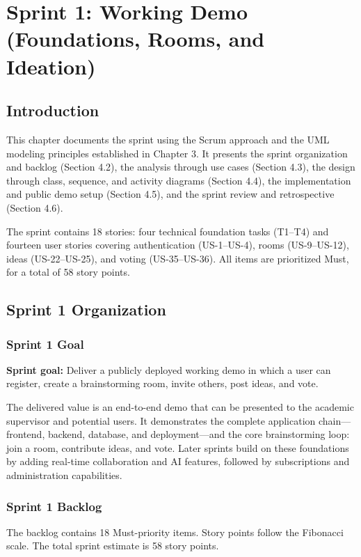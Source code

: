 \documentclass[12pt,a4paper]{report}
\begin{document}
\setcounter{chapter}{3}
\chapter{Sprint 1: Working Demo (Foundations, Rooms, and Ideation)}

\section{Introduction}


This chapter documents the sprint using the Scrum approach and the UML modeling principles established in Chapter 3. It presents the sprint organization and backlog (Section 4.2), the analysis through use cases (Section 4.3), the design through class, sequence, and activity diagrams (Section 4.4), the implementation and public demo setup (Section 4.5), and the sprint review and retrospective (Section 4.6).

The sprint contains 18 stories: four technical foundation tasks (T1--T4) and fourteen user stories covering authentication (US-1--US-4), rooms (US-9--US-12), ideas (US-22--US-25), and voting (US-35--US-36). All items are prioritized Must, for a total of 58 story points.

\section{Sprint 1 Organization}
\subsection{Sprint 1 Goal}
\textbf{Sprint goal:} Deliver a publicly deployed working demo in which a user can register, create a brainstorming room, invite others, post ideas, and vote.

The delivered value is an end-to-end demo that can be presented to the academic supervisor and potential users. It demonstrates the complete application chain---frontend, backend, database, and deployment---and the core brainstorming loop: join a room, contribute ideas, and vote. Later sprints build on these foundations by adding real-time collaboration and AI features, followed by subscriptions and administration capabilities.

\subsection{Sprint 1 Backlog}
The backlog contains 18 Must-priority items. Story points follow the Fibonacci scale. The total sprint estimate is 58 story points.
\end{document}
